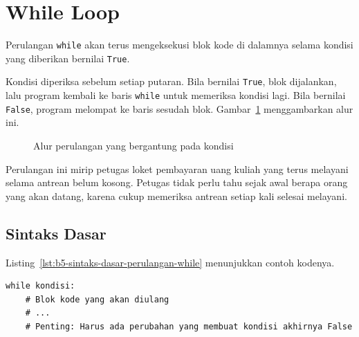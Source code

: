 \section{While Loop}
Perulangan \texttt{while} akan terus mengeksekusi blok kode di dalamnya selama kondisi yang diberikan bernilai \texttt{True}.

Kondisi diperiksa sebelum setiap putaran. Bila bernilai \texttt{True}, blok dijalankan, lalu program kembali ke baris \texttt{while} untuk memeriksa kondisi lagi. Bila bernilai \texttt{False}, program melompat ke baris sesudah blok. Gambar~\ref{fig:b5-alur-while} menggambarkan alur ini.

\begin{figure}[H]
  \centering
  \caption{Alur perulangan yang bergantung pada kondisi}
  \label{fig:b5-alur-while}
\end{figure}

Perulangan ini mirip petugas loket pembayaran uang kuliah yang terus melayani selama antrean belum kosong. Petugas tidak perlu tahu sejak awal berapa orang yang akan datang, karena cukup memeriksa antrean setiap kali selesai melayani.

\subsection{Sintaks Dasar}
Listing~\ref{lst:b5-sintaks-dasar-perulangan-while} menunjukkan contoh kodenya.

\begin{lstlisting}[style=PythonStyle, caption={Sintaks Dasar Perulangan while}, label={lst:b5-sintaks-dasar-perulangan-while}]
while kondisi:
    # Blok kode yang akan diulang
    # ...
    # Penting: Harus ada perubahan yang membuat kondisi akhirnya False
\end{lstlisting}

